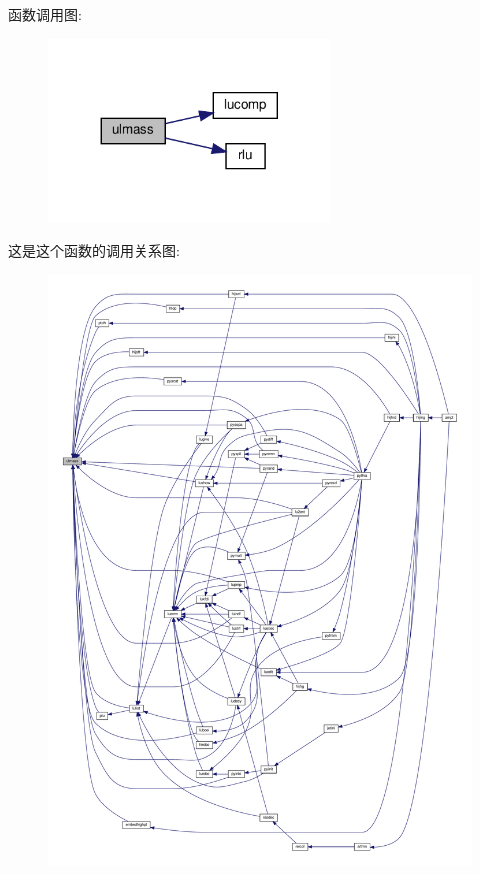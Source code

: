 函数调用图\+:
\nopagebreak
\begin{figure}[H]
\begin{center}
\leavevmode
\includegraphics[width=212pt]{ulmass_8f90_a7ec88d536ee9607c95d33dab0b6e25dd_cgraph}
\end{center}
\end{figure}
这是这个函数的调用关系图\+:
\nopagebreak
\begin{figure}[H]
\begin{center}
\leavevmode
\includegraphics[width=350pt]{ulmass_8f90_a7ec88d536ee9607c95d33dab0b6e25dd_icgraph}
\end{center}
\end{figure}
